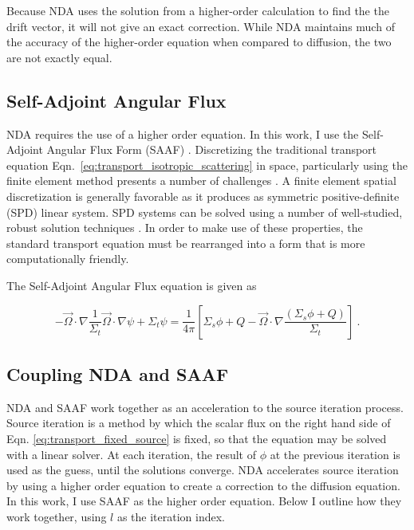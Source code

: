 Because NDA uses the solution from a higher-order calculation to find the the drift vector, it will not give an exact correction. While NDA maintains much of the accuracy of the higher-order equation when compared to diffusion, the two are not exactly equal. 




\subsection{Self-Adjoint Angular Flux}
NDA requires the use of a higher order equation. In this work, I use the Self-Adjoint Angular Flux Form (SAAF) \cite{SAAF}. Discretizing the traditional transport equation Eqn.~\eqref{eq:transport_isotropic_scattering} in space, particularly using the finite element method presents a number of challenges \cite{saaf}. A finite element spatial discretization is generally favorable as it produces as symmetric positive-definite (SPD) linear system. SPD systems can be solved using a number of well-studied, robust solution techniques \cite{Shewchuck1994}. In order to make use of these properties,  the standard transport equation must be rearranged into a form that is more computationally friendly.

The Self-Adjoint Angular Flux equation is given as

\begin{equation}
    - \vec{\Omega} \cdot \nabla \frac{1}{\Sigma_t}\vec{\Omega} \cdot \nabla \psi + \Sigma_t \psi = \frac{1}{4\pi}[\Sigma_s\phi + Q - \vec{\Omega} \cdot \nabla \frac{(\Sigma_s\phi + Q)}{\Sigma_t}]\:.
    \label{eq:SAAF}
\end{equation}


\subsection{Coupling NDA and SAAF}
NDA and SAAF work together as an acceleration to the source iteration process. Source iteration is a method by which the scalar flux on the right hand side of Eqn. \eqref{eq:transport_fixed_source} is fixed, so that the equation may be solved with a linear solver. At each iteration, the result of $\phi$ at the previous iteration is used as the guess, until the solutions converge. NDA accelerates source iteration by using a higher order equation to create a correction to the diffusion equation. In this work, I use SAAF as the higher order equation. Below I outline how they work together, using $l$ as the iteration index.

